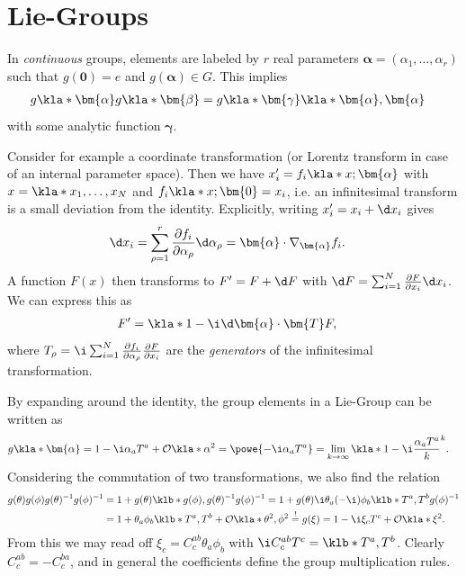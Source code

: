 \documentclass[english, parskip=full]{scrbook}
\begin{document}
\section{Lie-Groups}
In \emph{continuous} groups, elements are labeled by $r$ real parameters $\bm{\alpha}=(\alpha_1,\dots,\alpha_r)$ such that $g(\bm{0})=e$ and $g(\bm{\alpha}) \in G$.
This implies
\begin{align}
g\kla*{\bm{\alpha}} g\kla*{\bm{\beta}} &= g\kla*{\bm{\gamma}\kla*{\bm{\alpha},\bm{\alpha}}}
\end{align}
with some analytic function $\bm{\gamma}$.

Consider for example a coordinate transformation (or Lorentz transform in case of an internal parameter space).
Then we have $x_i' = f_i\kla*{x;\bm{\alpha}}$ with $x=\kla*{x_1,\dots,x_N}$ and $f_i\kla*{x;\bm{0}} = x_i$, i.e. an infinitesimal transform is a small deviation from the identity.
Explicitly, writing $x_i'=x_i+\d x_i$ gives
\begin{align}
\d x_i &= \sum_{\rho=1}^r \frac{\partial f_i}{\partial \alpha_\rho} \d \alpha_\rho = \bm{\alpha} \cdot \nabla_{\bm{\alpha}} f_i.
\end{align}
A function $F(x)$ then transforms to $F'=F+\d F$ with $\d F=\sum_{i=1}^N \frac{\partial F}{\partial x_i} \d x_i$.
We can express this as
\begin{align}
F' &= \kla*{1 - \i \d\bm{\alpha} \cdot \bm{T}} F,
\end{align}
where $T_\rho = \i\sum_{i=1}^N \frac{\partial f_i}{\partial\alpha_\rho} \frac{\partial F}{\partial x_i}$ are the \emph{generators} of the infinitesimal transformation.

By expanding around the identity, the group elements in a Lie-Group can be written as
\begin{align}
g\kla*{\bm{\alpha}} &= 1 - \i \alpha_a T^a + \mathcal{O}\kla*{\alpha^2} = \powe{-\i\alpha_a T^a} = \lim_{k\rightarrow\infty} \kla*{1 - \i \frac{\alpha_a T^a}{k}}^k.
\end{align}
Considering the commutation of two transformations, we also find the relation
\begin{align}
g(\theta)g(\phi)g(\theta)^{-1} g(\phi)^{-1} &= 1 + g(\theta)\klb*{g(\phi), g(\theta)^{-1}} g(\phi)^{-1} = 1 + g(\theta) \i\theta_a (-\i)\phi_b \klb*{T^a,T^b} g(\phi)^{-1}\\
&= 1 + \theta_a \phi_b\klb*{T^a,T^b} + \mathcal{O}\kla*{\theta^2,\phi^2} \overset{!}{=} g(\xi) = 1 - \i \xi_c T^c + \mathcal{O}\kla*{\xi^2}.
\end{align}
From this we may read off $\xi_c = C_c^{ab}\theta_a\phi_b$ with $\i C_c^{ab} T^c = \klb*{T^a,T^b}$.
Clearly $C_c^{ab}=-C_c^{ba}$, and in general the coefficients define the group multiplication rules.
\end{document}
